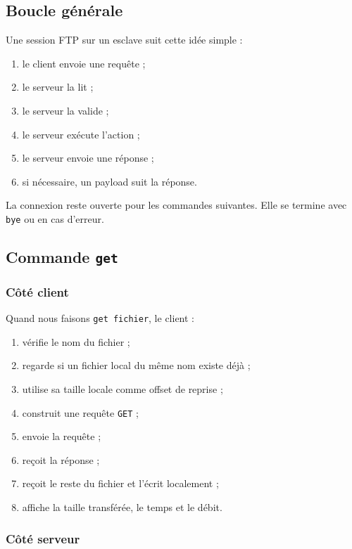 \documentclass[a4paper,11pt]{article}
\begin{document}
\subsection{Boucle générale}

Une session FTP sur un esclave suit cette idée simple :

\begin{enumerate}[leftmargin=*]
    \item le client envoie une requête ;
    \item le serveur la lit ;
    \item le serveur la valide ;
    \item le serveur exécute l'action ;
    \item le serveur envoie une réponse ;
    \item si nécessaire, un payload suit la réponse.
\end{enumerate}

La connexion reste ouverte pour les commandes suivantes. Elle se termine avec
\texttt{bye} ou en cas d'erreur.

\subsection{Commande \texttt{get}}

\subsubsection{Côté client}

Quand nous faisons \texttt{get fichier}, le client :

\begin{enumerate}[leftmargin=*]
    \item vérifie le nom du fichier ;
    \item regarde si un fichier local du même nom existe déjà ;
    \item utilise sa taille locale comme offset de reprise ;
    \item construit une requête \texttt{GET} ;
    \item envoie la requête ;
    \item reçoit la réponse ;
    \item reçoit le reste du fichier et l'écrit localement ;
    \item affiche la taille transférée, le temps et le débit.
\end{enumerate}

\subsubsection{Côté serveur}
\end{document}
